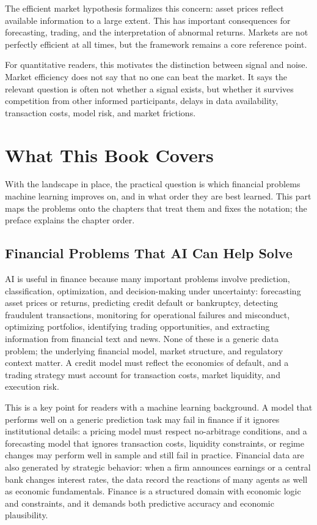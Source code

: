 \documentclass[../ai_in_finance]{subfiles}
\begin{document}
The efficient market hypothesis formalizes this concern: asset prices reflect available information to a large extent. This has important consequences for forecasting, trading, and the interpretation of abnormal returns. Markets are not perfectly efficient at all times, but the framework remains a core reference point.

For quantitative readers, this motivates the distinction between signal and noise. Market efficiency does not say that no one can beat the market. It says the relevant question is often not whether a signal exists, but whether it survives competition from other informed participants, delays in data availability, transaction costs, model risk, and market frictions.

\section{What This Book Covers}

With the landscape in place, the practical question is which financial problems machine learning improves on, and in what order they are best learned. This part maps the problems onto the chapters that treat them and fixes the notation; the preface explains the chapter order.

\subsection{Financial Problems That AI Can Help Solve}

AI is useful in finance because many important problems involve prediction, classification, optimization, and decision-making under uncertainty: forecasting asset prices or returns, predicting credit default or bankruptcy, detecting fraudulent transactions, monitoring for operational failures and misconduct, optimizing portfolios, identifying trading opportunities, and extracting information from financial text and news. None of these is a generic data problem; the underlying financial model, market structure, and regulatory context matter. A credit model must reflect the economics of default, and a trading strategy must account for transaction costs, market liquidity, and execution risk.

This is a key point for readers with a machine learning background. A model that performs well on a generic prediction task may fail in finance if it ignores institutional details: a pricing model must respect no-arbitrage conditions, and a forecasting model that ignores transaction costs, liquidity constraints, or regime changes may perform well in sample and still fail in practice. Financial data are also generated by strategic behavior: when a firm announces earnings or a central bank changes interest rates, the data record the reactions of many agents as well as economic fundamentals. Finance is a structured domain with economic logic and constraints, and it demands both predictive accuracy and economic plausibility.
\end{document}
